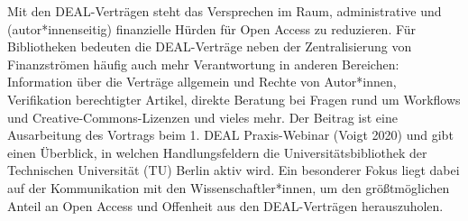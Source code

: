 Mit den DEAL-Verträgen steht das Versprechen im Raum, administrative und
(autor*innenseitig) finanzielle Hürden für Open Access zu reduzieren.
Für Bibliotheken bedeuten die DEAL-Verträge neben der Zentralisierung
von Finanzströmen häufig auch mehr Verantwortung in anderen Bereichen:
Information über die Verträge allgemein und Rechte von Autor*innen,
Verifikation berechtigter Artikel, direkte Beratung bei Fragen rund um
Workflows und Creative-Commons-Lizenzen und vieles mehr. Der Beitrag ist
eine Ausarbeitung des Vortrags beim 1. DEAL Praxis-Webinar (Voigt 2020)
und gibt einen Überblick, in welchen Handlungsfeldern die
Universitätsbibliothek der Technischen Universität (TU) Berlin aktiv
wird. Ein besonderer Fokus liegt dabei auf der Kommunikation mit den
Wissenschaftler*innen, um den größtmöglichen Anteil an Open Access und
Offenheit aus den DEAL-Verträgen herauszuholen.
